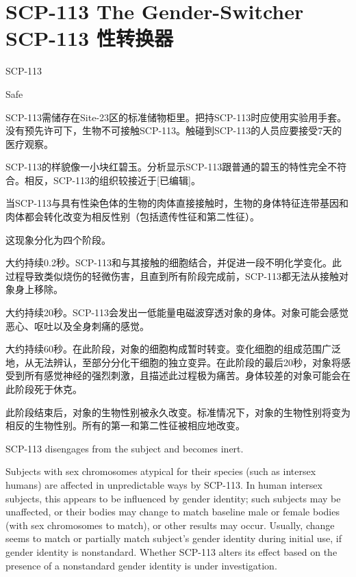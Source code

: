 \chapter[SCP-113 性转换器]{
    SCP-113 The Gender-Switcher\\
    SCP-113 性转换器
}

\label{chap:SCP-113}

SCP-113

Safe

SCP-113需储存在Site-23区的标准储物柜里。把持SCP-113时应使用实验用手套。没有预先许可下，生物不可接触SCP-113。触碰到SCP-113的人员应要接受7天的医疗观察。

SCP-113的样貌像一小块红碧玉。分析显示SCP-113跟普通的碧玉的特性完全不符合。相反，SCP-113的组织较接近于{[}已编辑]。

当SCP-113与具有性染色体的生物的肉体直接接触时，生物的身体特征连带基因和肉体都会转化改变为相反性别（包括遗传性征和第二性征）。

这现象分化为四个阶段。

大约持续0.2秒。SCP-113和与其接触的细胞结合，并促进一段不明化学变化。此过程导致类似烧伤的轻微伤害，且直到所有阶段完成前，SCP-113都无法从接触对象身上移除。

大约持续20秒。SCP-113会发出一低能量电磁波穿透对象的身体。对象可能会感觉恶心、呕吐以及全身刺痛的感觉。

大约持续60秒。在此阶段，对象的细胞构成暂时转变。变化细胞的组成范围广泛地，从无法辨认，至部分分化干细胞的独立变异。在此阶段的最后20秒，对象将感受到所有感觉神经的强烈刺激，且描述此过程极为痛苦。身体较差的对象可能会在此阶段死于休克。

此阶段结束后，对象的生物性别被永久改变。标准情况下，对象的生物性别将变为相反的生物性别。所有的第一和第二性征被相应地改变。

 SCP-113 disengages from the subject and becomes inert.

Subjects with sex chromosomes atypical for their species (such as intersex humans) are affected in unpredictable ways by SCP-113. In human intersex subjects, this appears to be influenced by gender identity; such subjects may be unaffected, or their bodies may change to match baseline male or female bodies (with sex chromosomes to match), or other results may occur. Usually, change seems to match or partially match subject's gender identity during initial use, if gender identity is nonstandard. Whether SCP-113 alters its effect based on the presence of a nonstandard gender identity is under investigation.

